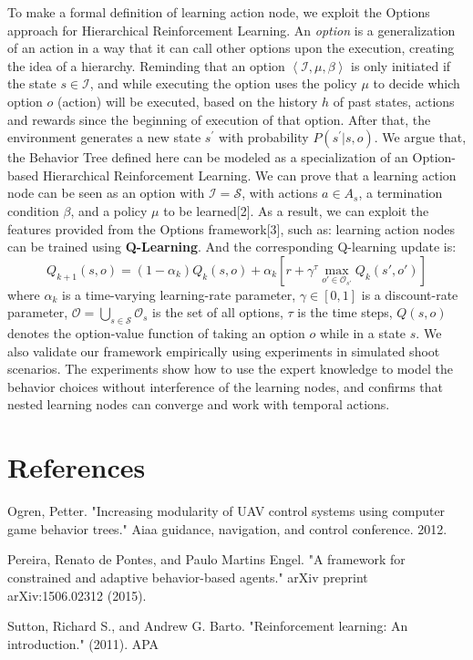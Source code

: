 \documentclass[a4paper,12pt]{article}
\begin{document}
To make a formal definition of learning action node, we exploit the Options approach for Hierarchical Reinforcement Learning. An \textit{option} is a generalization of an action in a way that it can call other options upon the execution, creating the idea of a hierarchy. Reminding that an option $\left\langle {\mathcal{I},\mu ,\beta } \right\rangle$ is only initiated if the state $s \in \mathcal{I}$, and while executing the option uses the policy $\mu$ to decide which option $o$ (action) will be executed, based on the history $h$ of past states, actions and rewards since the beginning of execution of that option. After that, the environment generates a new state $s^{\prime}$ with probability $P\left( {s^{\prime}|s,o} \right)$. We argue that, the Behavior Tree defined here can be modeled as a specialization of an Option-based Hierarchical Reinforcement Learning. We can prove that a learning action node can be seen as an option with $\mathcal{I}=\mathcal{S}$, with actions $a\in A_{s}$, a termination condition $\beta$, and a policy $\mu$ to be learned[2]. As a result, we can exploit the features provided from the Options framework[3], such as: learning action nodes can be trained using \textbf{Q-Learning}. And the corresponding Q-learning update is:
\begin{equation}
{Q_{k + 1}}\left( {s,o} \right) = \left( {1 - {\alpha _k}} \right){Q_k}\left( {s,o} \right) + {\alpha _k}\left[ {r + {\gamma ^\tau }\underset{o' \in {\mathcal{O}_{s'}}}{\max}{Q_k}\left( {s',o'} \right)} \right]
\end{equation}
where ${\alpha_k}$ is a time-varying learning-rate parameter, $\gamma  \in \left[ {0,1} \right]$ is a discount-rate parameter, $\mathcal{O}=\bigcup\nolimits_{s \in \mathcal{S}} {{\mathcal{O}_s}}$ is the set of all options, $\tau$ is the time steps, $Q(s,o)$ denotes the option-value function of taking an option $o$ while in a state $s$. 
We also validate our framework empirically using experiments in simulated shoot scenarios. The experiments show how to use the expert knowledge to model the behavior choices without interference of the learning nodes, and confirms that nested learning nodes can converge and work with temporal actions.





\section{References}
\noindent
[1] Ogren, Petter. "Increasing modularity of UAV control systems using computer game behavior trees." Aiaa guidance, navigation, and control conference. 2012.

\noindent
[2] Pereira, Renato de Pontes, and Paulo Martins Engel. "A framework for constrained and adaptive behavior-based agents." arXiv preprint arXiv:1506.02312 (2015).

\noindent
[3] Sutton, Richard S., and Andrew G. Barto. "Reinforcement learning: An introduction." (2011).
APA	
\end{document}

